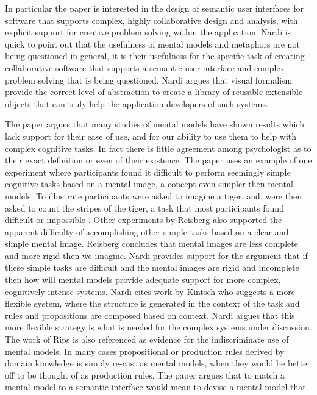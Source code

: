 \documentclass{sig-alternate}
\begin{document}
 
In particular the paper is interested in the design
of semantic user interfaces for software that supports complex, highly
collaborative design and analysis, with explicit support for creative problem
solving within the application. Nardi is quick to point out that the usefulness
of mental models and metaphors are not being questioned in general, it is their
usefulness for the specific task of creating collaborative software that
supports a semantic user interface and complex problem solving that is being
questioned. Nardi argues that visual formalism provide the correct level of
abstraction to create a library of reusable extensible objects that can truly
help the application developers of such systems. 
 
 
The paper argues that many
studies of mental models have shown results which lack support for their ease of
use, and for our ability to use them to help with complex cognitive tasks. In
fact there is little agreement among psychologist as to their exact definition
or even of their existence. The paper uses an example of one experiment where
participants found it difficult to perform seemingly simple cognitive tasks
based on a mental image, a concept even simpler then mental models. To
illustrate participants were asked to imagine a tiger, and, were then asked to
count the stripes of the tiger, a task that most participants found difficult or
impossible \cite{Reisberg:ExternalRepresentations}.  Other experiments by
Reisberg also supported the apparent difficulty of accomplishing other simple
tasks based on a clear and simple mental image. Reisberg concludes that mental images are less complete and
more rigid then we imagine. Nardi provides support for the argument that if these
simple tasks are difficult and the mental images are rigid and incomplete then
how will mental models provide adequate support for more complex, cognitively
intense systems. Nardi cites work by Kintsch
\cite{Kintsch:88:TheRoleOfKnowledge} who suggests a more flexible system, where the structure is generated in the context of the task and rules and propositions
are composed based on context. Nardi argues that this more flexible strategy is
what is needed for the complex systems under discussion. The work of Rips
\cite{Rips:MentalMuddles} is also referenced as evidence for the indiscriminate
use of mental models. In many cases propositional or production rules derived by
domain knowledge is simply re-cast as mental models, when they would be better
off to be thought of as production rules. The paper argues that to match a
mental model to a semantic interface would mean to devise a mental model that
\end{document}
